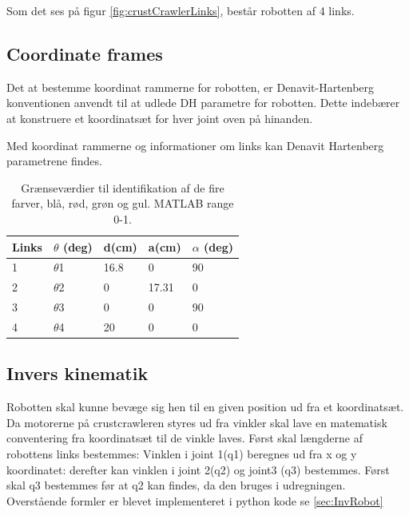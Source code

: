 
Som det ses på figur \ref{fig:crustCrawlerLinks}, består robotten af 4 links. 

\subsection{Coordinate frames}
Det at bestemme koordinat rammerne for robotten, er Denavit-Hartenberg konventionen anvendt til at udlede DH parametre for robotten. Dette indebærer at konstruere et koordinatsæt for hver joint oven på hinanden. 


Med koordinat rammerne og informationer om links kan Denavit Hartenberg parametrene findes. 

\begin{table}[H]
\centering
\begin{tabular}{l|l|l|l|l}
Links	&	$\theta$ (deg) 	&	d(cm)		&	a(cm)		& 	$\alpha$ (deg)\\
\hline
1		&	$\theta$1			&	16.8			&	0			&	90\\
2		&	$\theta$2			&	0			&	17.31		&	0\\
3		&	$\theta$3			&	0			&	0			&	90\\
4		&	$\theta$4			&	20		&	0			&	0\\
\end{tabular}	
\caption{Grænseværdier til identifikation af de fire farver, blå, rød, grøn og gul. MATLAB range 0-1.}
\end{table}

\subsection{Invers kinematik}
Robotten skal kunne bevæge sig hen til en given position ud fra et koordinatsæt. Da motorerne på crustcrawleren styres ud fra vinkler skal lave
en matematisk conventering fra koordinatsæt til de vinkle laves.\newline
Først skal længderne af robottens links bestemmes:
Vinklen i joint 1(q1) beregnes ud fra x og y koordinatet:
derefter kan vinklen i joint 2(q2) og joint3 (q3) bestemmes. Først skal q3 bestemmes før at q2 kan findes, da den bruges i udregningen.
Overstående formler er blevet implementeret i python kode se \vref{sec:InvRobot}





